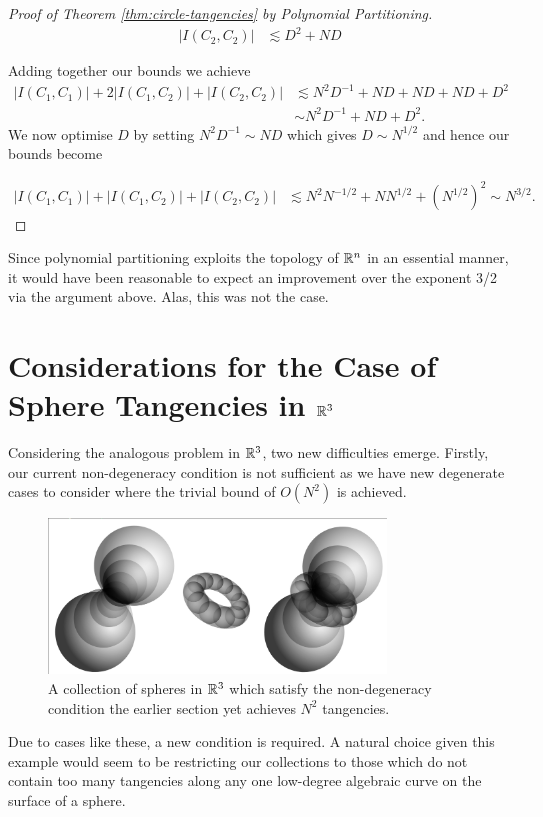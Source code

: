 \begin{proof}[Proof of Theorem \ref{thm:circle-tangencies} by Polynomial Partitioning]
\begin{align*}
    |I(C_2,C_2)| &\lesssim D^2 + ND
\end{align*}

Adding together our bounds we achieve
\begin{align*}
    |I(C_1,C_1)|+2|I(C_1,C_2)|+|I(C_2,C_2)| &\lesssim N^2D^{-1} + ND + ND + ND + D^2 \\
    &\sim N^2D^{-1} + ND + D^2.
\end{align*}
We now optimise $D$ by setting $N^2D^{-1} \sim ND$ which gives $D \sim N^{1/2}$ and hence our bounds become

\begin{align*}
    |I(C_1,C_1)|+|I(C_1,C_2)|+|I(C_2,C_2)| &\lesssim N^2N^{-1/2} + NN^{1/2} + (N^{1/2})^2 \sim N^{3/2}.
\end{align*}
\end{proof}
\begin{remark}
    Since polynomial partitioning exploits the topology of $\mathbb R^n$ in an essential manner, it would have been reasonable to expect an improvement over the exponent 3/2 via the argument above. Alas, this was not the case.
\end{remark}

\section[The Case of Sphere Tangencies in $\RR^{3}$]{Considerations for the Case of Sphere Tangencies in $\RR^{3}$}
Considering the analogous problem in $\RR^{3}$, two new difficulties emerge. 
Firstly, our current non-degeneracy condition is not sufficient as we have new degenerate cases to consider where the trivial bound of $O(N^2)$ is achieved. 
\begin{example}
    \begin{figure}[h]
        \centering 
        \includegraphics[width=0.8\textwidth]{images/degenr3.png}
        \caption{A collection of spheres in $\mathbb R^3$ which satisfy the non-degeneracy condition the earlier section yet achieves $N^2$ tangencies.}
        \end{figure}
\end{example}
Due to cases like these, a new condition is required. A natural choice given this example would seem to be restricting our collections to those which do not contain too many tangencies along any one low-degree algebraic curve on the surface of a sphere. 

